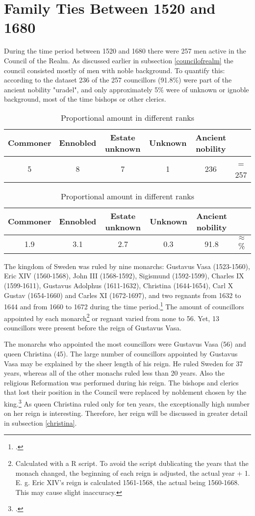 \section{Family Ties Between 1520 and 1680}
During the time period between 1520 and 1680 there were 257 men active in the Council of the Realm. As discussed earlier in subsection \ref{councilofrealm} the council consisted mostly of men with noble background. To quantify this: according to the dataset 236 of the 257 councillors (91.8\%) were part of the ancient nobility "uradel", and only approximately 5\% were of unknown or ignoble background, most of the time bishops or other clerics.  

\begin{table}
	\caption{Absolute amount in different ranks}
	\centering
	\begin{tabular}{cccccc}
		\hline
		Commoner & Ennobled & Estate unknown & Unknown & Ancient nobility & \\
		\hline
		5 & 8 & 7 & 1 & 236 & = 257 \\
		\hline
	\end{tabular}
	\caption{Proportional amount in different ranks}
	\centering
	\begin{tabular}{cccccc}
		\hline
	    Commoner & Ennobled & Estate unknown & Unknown & Ancient nobility & \\
	    \hline
	    1.9 & 3.1 & 2.7 & 0.3 & 91.8 & $\approx$ \% \\
	\end{tabular}
\end{table}

The kingdom of Sweden was ruled by nine monarchs: Gustavus Vasa (1523-1560), Eric XIV (1560-1568), John III (1568-1592), Sigismund (1592-1599), Charles IX (1599-1611), Gustavus Adolphus (1611-1632), Christina (1644-1654), Carl X Gustav (1654-1660) and Carles XI (1672-1697), and two regnants from 1632 to 1644 and from 1660 to 1672 during the time period.\footcite[p. 11]{lappalainen06} The amount of councillors appointed by each monarch\footnote{Calculated with a R script. To avoid the script dublicating the years that the monach changed, the beginning of each reign is adjusted, the actual year + 1. E. g. Eric XIV's reign is calculated 1561-1568, the actual being 1560-1668. This may cause slight inaccuracy.} or regnant varied from none to 56. Yet, 13 councillors were present before the reign of Gustavus Vasa.

The monarchs who appointed the most councillors were Gustavus Vasa (56) and queen Christina (45). The large number of councillors appointed by Gustavus Vasa may be explained by the sheer length of his reign. He ruled Sweden for 37 years, whereas all of the other monachs ruled less than 20 years. Also the religious Reformation was performed during his reign. The bishops and clerics that lost their position in the Council were replaced by noblement chosen by the king.\footcite[TODO]{pSuurvalta} As queen Christina ruled only for ten years, the exceptionally high number on her reign is interesting. Therefore, her reign will be discussed in greater detail in subsection \ref{christina}. 

